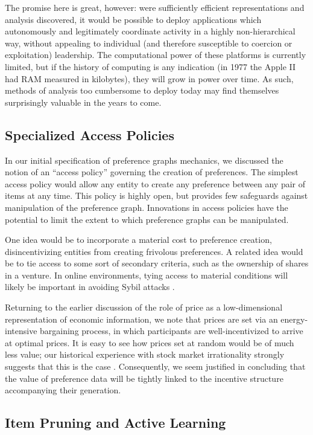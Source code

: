 The promise here is great, however: were sufficiently efficient representations and analysis discovered, it would be possible to deploy applications which autonomously and legitimately coordinate activity  in a highly non-hierarchical way, without appealing to individual (and therefore susceptible to coercion or exploitation) leadership.
The computational power of these platforms is currently limited, but if the history of computing is any indication (in 1977 the Apple II had RAM measured in kilobytes), they will grow in power over time.
As such, methods of analysis too cumbersome to deploy today may find themselves surprisingly valuable in the years to come.

\subsection{Specialized Access Policies}

In our initial specification of preference graphs mechanics, we discussed the notion of an ``access policy'' governing the creation of preferences.
The simplest access policy would allow any entity to create any preference between any pair of items at any time.
This policy is highly open, but provides few safeguards against manipulation of the preference graph.
Innovations in access policies have the potential to limit the extent to which preference graphs can be manipulated.

One idea would be to incorporate a material cost to preference creation, disincentivizing  entities from creating frivolous preferences.
A related idea would be to tie access to some sort of secondary criteria, such as the ownership of shares in a venture.
In online environments, tying access to material conditions will likely be important in avoiding Sybil attacks \citep{danezis:2006}.

Returning to the earlier discussion of the role of price as a low-dimensional representation of economic information, we note that prices are set via an energy-intensive bargaining process, in which participants are well-incentivized to arrive at optimal prices.
It is easy to see how prices set at random would be of much less value; our historical experience with stock market irrationality strongly suggests that this is the case \citep{minsky}.
Consequently, we seem justified in concluding that the value of preference data will be tightly linked to the incentive structure accompanying their generation.

\subsection{Item Pruning and Active Learning}


